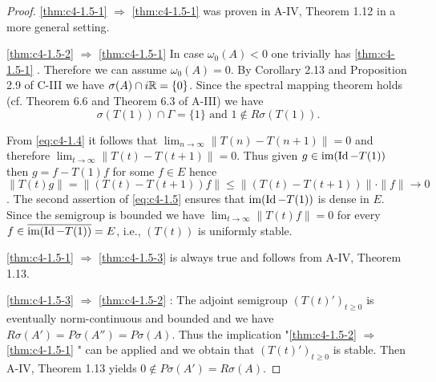 \begin{proof}
\ref{thm:c4-1.5-1} $\Rightarrow$ \ref{thm:c4-1.5-1} was proven in A-IV, Theorem 1.12 in a more general setting.

\ref{thm:c4-1.5-2} $\Rightarrow$ \ref{thm:c4-1.5-1} In case $\omega_{0}(A) < 0$ one trivially has \ref{thm:c4-1.5-1} .
Therefore we can assume $\omega_{0}(A) = 0$.
By Corollary
2.13 and Proposition
2.9 of C-III we have $\sigma(A) \cap i\mathbb{R} = \{0\}$.
Since the spectral mapping theorem holds (cf. Theorem 6.6 
and Theorem 6.3 of A-III) we have
\begin{equation}\label{eq:c4-1.5}
\sigma(T(1)) \cap \Gamma = \{1\} \text{ and } 1 \notin R{\sigma}(T(1)) .
\end{equation}

From \ref{eq:c4-1.4} it follows that $\lim_{n \to \infty} \|T(n) - T(n+1)\| = 0$ and therefore $\lim_{t \to \infty} \|T(t) - T(t+1)\| = 0$.
Thus given $g \in \text{im}(\operatorname{Id} - T(1))$ then $g = f - T(1)f$ for some $f \in E$ hence $\|T(t)g\| = \|(T(t) - T(t+1))f\| \leq \|(T(t) - T(t+1))\| \cdot \|f\| \to 0$.
The second assertion of \ref{eq:c4-1.5} ensures that $\text{im}(\operatorname{Id} - T(1))$ is dense in $E$.
Since the semigroup is bounded we have $\lim_{t \to \infty} \|T(t)f\| = 0$ for every $f \in \overline{\text{im}(\operatorname{Id} - T(1))} = E$, i.e., $(T(t))$ is uniformly stable.

\ref{thm:c4-1.5-1} $\Rightarrow$ \ref{thm:c4-1.5-3} is always true and follows from A-IV, Theorem 1.13.

\ref{thm:c4-1.5-3} $\Rightarrow$ \ref{thm:c4-1.5-2} : 
The adjoint semigroup $(T(t)')_{t \geq 0}$ is eventually norm-continuous and bounded and we have $R{\sigma}(A') = P{\sigma}(A'') = P{\sigma}(A)$.
Thus the implication "\ref{thm:c4-1.5-2} $\Rightarrow$ \ref{thm:c4-1.5-1} " can be applied and we obtain that $(T(t)')_{t \geq 0}$ is stable.
Then A-IV, Theorem 1.13 
yields $0 \notin P{\sigma}(A') = R{\sigma}(A)$.
\end{proof}

